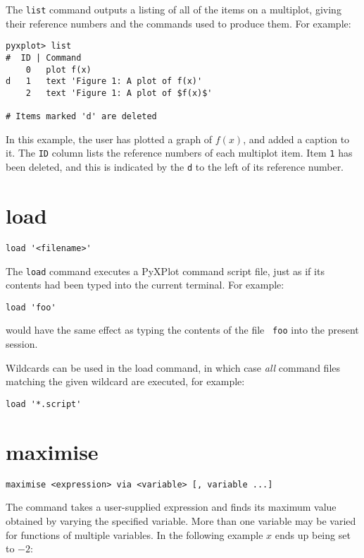The {\tt list} command outputs a listing of all of the items on a multiplot,
giving their reference numbers and the commands used to produce them. For
example:

\begin{verbatim}
pyxplot> list
#  ID | Command 
    0   plot f(x) 
d   1   text 'Figure 1: A plot of f(x)' 
    2   text 'Figure 1: A plot of $f(x)$' 

# Items marked 'd' are deleted 
\end{verbatim}

In this example, the user has plotted a graph of $f(x)$, and added a caption to
it. The {\tt ID} column lists the reference numbers of each multiplot item.
Item {\tt 1} has been deleted, and this is indicated by the {\tt d} to the left
of its reference number.

\section{load}

\begin{verbatim}
load '<filename>'
\end{verbatim}

The {\tt load} command executes a PyXPlot command script file, just as if its
contents had been typed into the current terminal. For example:

\begin{verbatim}
load 'foo'
\end{verbatim}

\noindent would have the same effect as typing the contents of the file {\tt
foo} into the present session.

Wildcards can be used in the load command, in which case {\it all} command
files matching the given wildcard are executed, for example:

\begin{verbatim}
load '*.script'
\end{verbatim}

\section{maximise}

\begin{verbatim}
maximise <expression> via <variable> [, variable ...]
\end{verbatim}

The  command takes a user-supplied expression and finds its
maximum value obtained by varying the specified variable.  More than one
variable may be varied for functions of multiple variables.  In the following
example $x$ ends up being set to $-2$:

